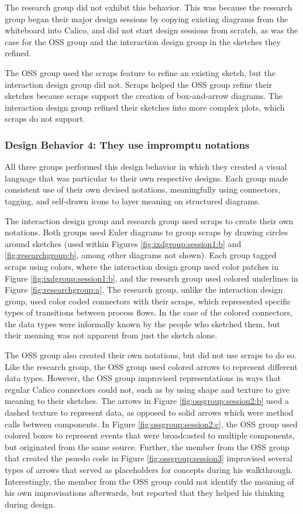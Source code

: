 The research group did not exhibit this behavior. This was because the research group began their major design sessions by copying existing diagrams from the whiteboard into Calico, and did not start design sessions from scratch, as was the case for the OSS group and the interaction design group in the sketches they refined.

The OSS group used the scraps feature to refine an existing sketch, but the interaction design group did not. Scraps helped the OSS group refine their sketches because scraps support the creation of box-and-arrow diagrams. The interaction design group refined their sketches into more complex plots, which scraps do not support.

\subsubsection{Design Behavior 4: They use impromptu notations}

All three groups performed this design behavior in which they created a visual language that was particular to their own respective designs. Each group made consistent use of their own devised notations, meaningfully using connectors, tagging, and self-drawn icons to layer meaning on structured diagrams.

The interaction design group and research group used scraps to create their own notations. Both groups used Euler diagrams to group scraps by drawing circles around sketches (used within Figures \ref{fig:ixdgroup:session1:b} and \ref{fig:researchgroup:b}, among other diagrams not shown). Each group tagged scraps using colors, where the interaction design group used color patches in Figure \ref{fig:ixdgroup:session1:b}, and the research group used colored underlines in Figure \ref{fig:researchgroup:a}. The research group, unlike the interaction design group, used color coded connectors with their scraps, which represented specific types of transitions between process flows. In the case of the colored connectors, the data types were informally known by the people who sketched them, but their meaning was not apparent from just the sketch alone. 

The OSS group also created their own notations, but did not use scraps to do so. Like the research group, the OSS group used colored arrows to represent different data types. However, the OSS group improvised representations in ways that regular Calico connectors could not, such as by using shape and texture to give meaning to their sketches. The arrows in Figure \ref{fig:ossgroup:session2:b} used a dashed texture to represent data, as opposed to solid arrows which were method calls between components. In Figure \ref{fig:ossgroup:session2:c}, the OSS group used colored boxes to represent events that were broadcasted to multiple components, but originated from the same source. Further, the member from the OSS group that created the psuedo code in Figure \ref{fig:ossgroup:session3} improvised several types of arrows that served as placeholders for concepts during his walkthrough. Interestingly, the member from the OSS group could not identify the meaning of his own improvisations afterwards, but reported that they helped his thinking during design.

